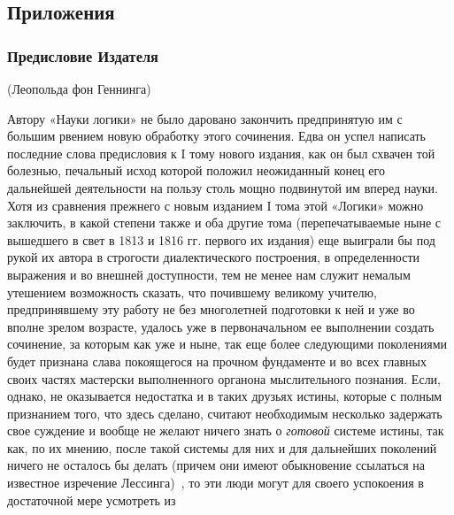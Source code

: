 \clearpage\subsection{Приложения}
\subsubsection{Предисловие Издателя}
{\centering
(Леопольда фон Геннинга)
\par}

Автору «Науки логики» не было даровано закончить предпринятую им с большим
рвением новую обработку этого сочинения. Едва он успел написать последние
слова предисловия к I тому нового издания, как он был схвачен той болезнью,
печальный исход которой положил неожиданный конец его дальнейшей
деятельности на пользу столь мощно подвинутой им вперед науки. Хотя из
сравнения прежнего с новым изданием I тома этой «Логики» можно заключить, в
какой степени также и оба другие тома (перепечатываемые ныне с вышедшего в
свет в 1813 и 1816 гг. первого их издания) еще выиграли бы под рукой их
автора в строгости диалектического построения, в определенности выражения и
во внешней доступности, тем не менее нам служит немалым утешением
возможность сказать, что почившему великому учителю, предпринявшему эту
работу не без многолетней подготовки к ней и уже во вполне зрелом возрасте,
удалось уже в первоначальном ее выполнении создать сочинение, за которым
как уже и ныне, так еще более следующими поколениями будет признана слава
покоящегося на прочном фундаменте и во всех главных своих частях мастерски
выполненного органона мыслительного познания. Если, однако, не оказывается
недостатка и в таких друзьях истины, которые с полным признанием того, что
здесь сделано, считают необходимым несколько задержать свое суждение и
вообще не желают ничего знать о {\em готовой} системе
истины, так как, по их мнению, после такой системы для них и для дальнейших
поколений ничего не осталось бы делать (причем они имеют обыкновение
ссылаться на известное изречение
Лессинга)~,
то эти люди могут для своего успокоения в достаточной мере усмотреть из
